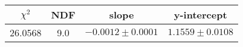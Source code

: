 \begin{tabular}{|c|c|c|c|}

\hline
$\chi^{2}$ & NDF & slope & y-intercept  \\
\hline
26.0568 & 9.0 & $-0.0012\pm0.0001$ & $1.1559\pm0.0108$ \\
\hline

\end{tabular}